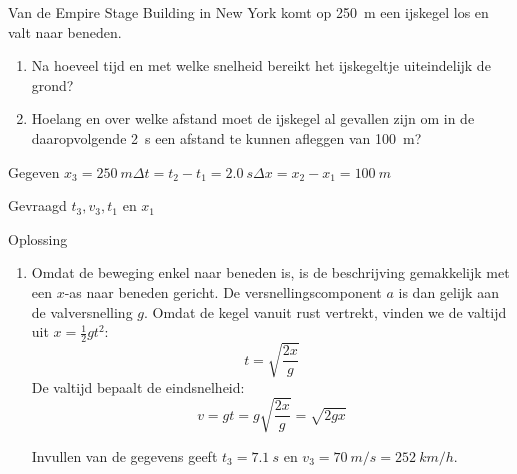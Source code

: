
\begin{exercise}



\item Van de Empire Stage Building in New York komt op \SI{250}{m} een ijskegel los en valt naar beneden.
\begin{enumerate}
\item Na hoeveel tijd en met welke snelheid bereikt het ijskegeltje uiteindelijk de grond?
\item Hoelang en over welke afstand moet de ijskegel al gevallen zijn om in de daaropvolgende \SI{2}{s} een afstand te kunnen afleggen van \SI{100}{m}?
\end{enumerate}
\begin{oplossing}
\item[Gegeven]$x_3=\SI{250}{m}$\newline$\Delta t=t_2-t_1=\SI{2,0}{s}$\newline$\Delta x=x_2-x_1=\SI{100}{m}$
\item[Gevraagd]$t_3,v_3,t_1$ en $x_1$
\item[Oplossing]
\begin{enumerate}

\item\begin{minipage}[t]{0.63\linewidth}
	Omdat de beweging enkel naar beneden is, is de beschrijving gemakkelijk met een $x$-as naar beneden gericht. De versnellingscomponent $a$ is dan gelijk aan de valversnelling $g$. Omdat de kegel vanuit rust vertrekt, vinden we de valtijd uit $x=\frac{1}{2}gt^2$:
\begin{equation*}
t=\sqrt{\frac{2x}{g}}
\end{equation*}
De valtijd bepaalt de eindsnelheid:
\begin{equation*}
v=gt=g\sqrt{\frac{2x}{g}}=\sqrt{2gx}
\end{equation*}
\end{minipage}%
\begin{minipage}[t]{0.37\linewidth}
\end{minipage}

Invullen van de gegevens geeft $t_3=\SI{7,1}{s}$ en $v_3=\SI{70}{m/s}=\SI{252}{km/h}$.


\end{enumerate}
\end{oplossing}
\end{exercise}
